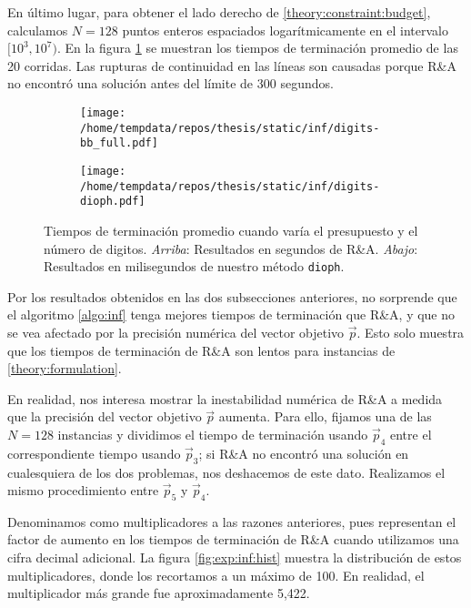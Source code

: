 En último lugar, para obtener el lado derecho de \eqref{theory:constraint:budget}, calculamos $N = 128$
puntos enteros espaciados logarítmicamente en el intervalo $[10^3, 10^7)$. En la figura
\ref{fig:exp:inf:rhs} se muestran los tiempos de terminación promedio de las 20 corridas. Las
rupturas de continuidad en las líneas son causadas porque R\&A no encontró una solución antes del
límite de 300 segundos.

\begin{figure}[hbtp]
  \centering
  \begin{subfigure}{0.80\textwidth}
    \centering
    \texttt{[image: /home/tempdata/repos/thesis/static/inf/digits-bb\_full.pdf]}
  \end{subfigure}
  \hfill
  \begin{subfigure}{0.80\textwidth}
    \centering
    \texttt{[image: /home/tempdata/repos/thesis/static/inf/digits-dioph.pdf]}
  \end{subfigure}

  \caption{Tiempos de terminación promedio cuando varía el presupuesto y el
			número de digitos. \textit{Arriba}: Resultados en segundos de R\&A. \textit{Abajo}:
			Resultados en milisegundos de nuestro método \texttt{dioph}.}
  \label{fig:exp:inf:rhs}
\end{figure}

Por los resultados obtenidos en las dos subsecciones anteriores, no sorprende que el algoritmo
\ref{algo:inf} tenga mejores tiempos de terminación que R\&A, y que no se vea afectado por la
precisión numérica del vector objetivo $\vec{p}$. Esto solo muestra que los tiempos de terminación
de R\&A son lentos para instancias de \eqref{theory:formulation}.

En realidad, nos interesa mostrar la inestabilidad numérica de R\&A a medida que la precisión del
vector objetivo $\vec{p}$ aumenta. Para ello, fijamos una de las $N = 128$ instancias y dividimos el
tiempo de terminación usando $\vec{p}_4$ entre el correspondiente tiempo usando $\vec{p}_3$; si
R\&A no encontró una solución en cualesquiera de los dos problemas, nos deshacemos de este
dato. Realizamos el mismo procedimiento entre $\vec{p}_5$ y $\vec{p}_4$.

Denominamos como multiplicadores a las razones anteriores, pues representan el factor de aumento en
los tiempos de terminación de R\&A cuando utilizamos una cifra decimal adicional. La figura
\ref{fig:exp:inf:hist} muestra la distribución de estos multiplicadores, donde los recortamos a un
máximo de 100. En realidad, el multiplicador más grande fue aproximadamente 5{,}422.

